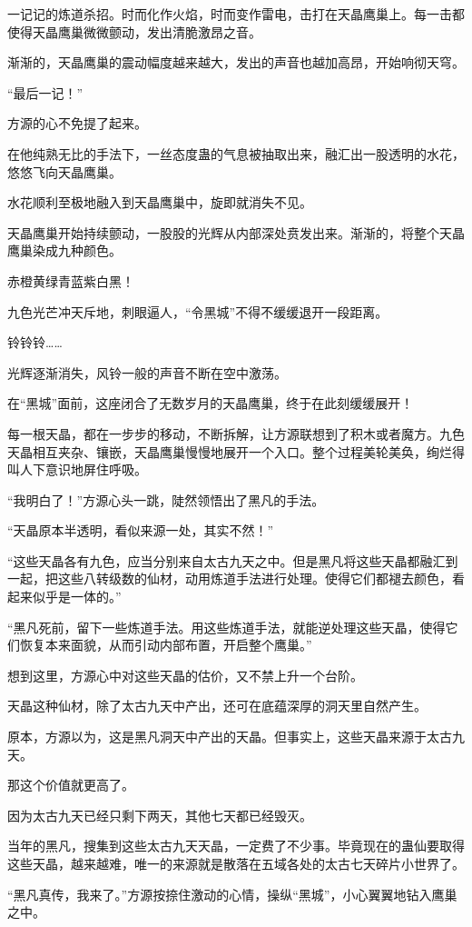 \begin{this_body}
一记记的炼道杀招。时而化作火焰，时而变作雷电，击打在天晶鹰巢上。每一击都使得天晶鹰巢微微颤动，发出清脆激昂之音。

渐渐的，天晶鹰巢的震动幅度越来越大，发出的声音也越加高昂，开始响彻天穹。

“最后一记！”

方源的心不免提了起来。

在他纯熟无比的手法下，一丝态度蛊的气息被抽取出来，融汇出一股透明的水花，悠悠飞向天晶鹰巢。

水花顺利至极地融入到天晶鹰巢中，旋即就消失不见。

天晶鹰巢开始持续颤动，一股股的光辉从内部深处贲发出来。渐渐的，将整个天晶鹰巢染成九种颜色。

赤橙黄绿青蓝紫白黑！

九色光芒冲天斥地，刺眼逼人，“令黑城”不得不缓缓退开一段距离。

铃铃铃……

光辉逐渐消失，风铃一般的声音不断在空中激荡。

在“黑城”面前，这座闭合了无数岁月的天晶鹰巢，终于在此刻缓缓展开！

每一根天晶，都在一步步的移动，不断拆解，让方源联想到了积木或者魔方。九色天晶相互夹杂、镶嵌，天晶鹰巢慢慢地展开一个入口。整个过程美轮美奂，绚烂得叫人下意识地屏住呼吸。

“我明白了！”方源心头一跳，陡然领悟出了黑凡的手法。

“天晶原本半透明，看似来源一处，其实不然！”

“这些天晶各有九色，应当分别来自太古九天之中。但是黑凡将这些天晶都融汇到一起，把这些八转级数的仙材，动用炼道手法进行处理。使得它们都褪去颜色，看起来似乎是一体的。”

“黑凡死前，留下一些炼道手法。用这些炼道手法，就能逆处理这些天晶，使得它们恢复本来面貌，从而引动内部布置，开启整个鹰巢。”

想到这里，方源心中对这些天晶的估价，又不禁上升一个台阶。

天晶这种仙材，除了太古九天中产出，还可在底蕴深厚的洞天里自然产生。

原本，方源以为，这是黑凡洞天中产出的天晶。但事实上，这些天晶来源于太古九天。

那这个价值就更高了。

因为太古九天已经只剩下两天，其他七天都已经毁灭。

当年的黑凡，搜集到这些太古九天天晶，一定费了不少事。毕竟现在的蛊仙要取得这些天晶，越来越难，唯一的来源就是散落在五域各处的太古七天碎片小世界了。

“黑凡真传，我来了。”方源按捺住激动的心情，操纵“黑城”，小心翼翼地钻入鹰巢之中。

\end{this_body}

